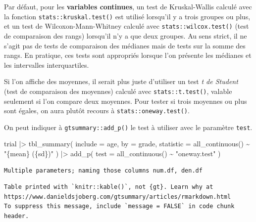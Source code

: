\documentclass[
  letterpaper,
  DIV=11,
  numbers=noendperiod,
  oneside]{scrreprt}
\newenvironment{Shaded}{\begin{snugshade}}{\end{snugshade}}
\newcommand{\AttributeTok}[1]{\textcolor[rgb]{0.40,0.45,0.13}{#1}}
\newcommand{\FunctionTok}[1]{\textcolor[rgb]{0.28,0.35,0.67}{#1}}
\newcommand{\NormalTok}[1]{\textcolor[rgb]{0.00,0.23,0.31}{#1}}
\newcommand{\SpecialCharTok}[1]{\textcolor[rgb]{0.37,0.37,0.37}{#1}}
\newcommand{\StringTok}[1]{\textcolor[rgb]{0.13,0.47,0.30}{#1}}
\begin{document}
Par défaut, pour les \textbf{variables continues}, un test de
Kruskal-Wallis calculé avec la fonction \texttt{stats::kruskal.test()}
est utilisé lorsqu'il y a trois groupes ou plus, et un test de
Wilcoxon-Mann-Whitney calculé avec \texttt{stats::wilcox.test()} (test
de comparaison des rangs) lorsqu'il n'y a que deux groupes. Au sens
strict, il ne s'agit pas de tests de comparaison des médianes mais de
tests sur la somme des rangs. En
pratique, ces tests sont appropriés lorsque l'on présente les médianes
et les intervalles interquartiles.

Si l'on affiche des moyennes, il serait plus juste d'utiliser un test
\emph{t de Student} (test de comparaison des moyennes) calculé avec
\texttt{stats::t.test()}, valable seulement si l'on compare deux
moyennes. Pour tester si trois moyennes ou plus sont égales, on aura
plutôt recours à \texttt{stats::oneway.test()}.

On peut indiquer à \texttt{gtsummary::add\_p()} le test à utiliser avec
le paramètre \texttt{test}.

\begin{Shaded}
\begin{Highlighting}[]
\NormalTok{trial }\SpecialCharTok{|\textgreater{}} 
  \FunctionTok{tbl\_summary}\NormalTok{(}
    \AttributeTok{include =}\NormalTok{ age,}
    \AttributeTok{by =}\NormalTok{ grade,}
    \AttributeTok{statistic =} \FunctionTok{all\_continuous}\NormalTok{() }\SpecialCharTok{\textasciitilde{}} \StringTok{"\{mean\} (\{sd\})"}
\NormalTok{  ) }\SpecialCharTok{|\textgreater{}} 
  \FunctionTok{add\_p}\NormalTok{(}
    \AttributeTok{test =} \FunctionTok{all\_continuous}\NormalTok{() }\SpecialCharTok{\textasciitilde{}} \StringTok{"oneway.test"}
\NormalTok{  )}
\end{Highlighting}
\end{Shaded}

\begin{verbatim}
Multiple parameters; naming those columns num.df, den.df
\end{verbatim}

\begin{verbatim}
Table printed with `knitr::kable()`, not {gt}. Learn why at
https://www.danieldsjoberg.com/gtsummary/articles/rmarkdown.html
To suppress this message, include `message = FALSE` in code chunk header.
\end{verbatim}
\end{document}
